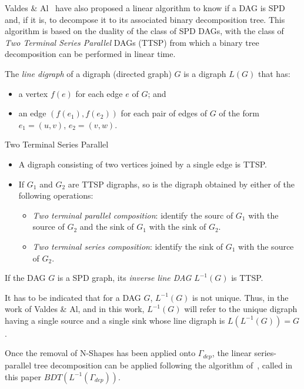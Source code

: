 Valdes \& Al~\cite{Valdes:1979:RSP:800135.804393} have also proposed a linear algorithm to know if a DAG is SPD and, if it is, to decompose it to its associated binary decomposition tree. This algorithm is based on the duality of the class of SPD DAGs, with the class of \emph{Two Terminal Series Parallel} DAGs (TTSP) from which a binary tree decomposition can be performed in linear time. 

\begin{mydef}
The \emph{line digraph} of a digraph (directed graph) $G$ is a digraph $L(G)$ that has:
\begin{itemize}
\item a vertex $f(e)$ for each edge $e$ of $G$; and
\item an edge $(f(e_1),f(e_2))$ for each pair of edges of $G$ of the form $e_1=(u,v)$, $e_2=(v,w)$.
\end{itemize}
\end{mydef}

\begin{mydef}Two Terminal Series Parallel
\begin{itemize}
\item A digraph consisting of two vertices joined by a single edge is TTSP.
\item If $G_1$ and $G_2$ are TTSP digraphs, so is the digraph obtained by either of the following operations:
\begin{itemize}
\item \emph{Two terminal parallel composition}: identify the sourc of $G_1$ with the source of $G_2$ and the sink of $G_1$ with the sink of $G_2$.
\item \emph{Two terminal series composition}: identify the sink of $G_1$ with the source of $G_2$.
\end{itemize}
\end{itemize}
\end{mydef}

\begin{myth}
If the DAG $G$ is a SPD graph, its \emph{inverse line DAG} $L^{-1}(G)$ is TTSP.
\end{myth}

It has to be indicated that for a DAG $G$, $L^{-1}(G)$ is not unique. Thus, in the work of Valdes \& Al, and in this work, $L^{-1}(G)$ will refer to the unique digraph having a single source and a single sink whose line digraph is $L(L^{-1}(G))=G$.

Once the removal of N-Shapes has been applied onto $\Gamma_{dep}$, the linear series-parallel tree decomposition can be applied following the algorithm of~\cite{Valdes:1979:RSP:800135.804393}, called in this paper $BDT(L^{-1}(\Gamma_{dep}))$.

